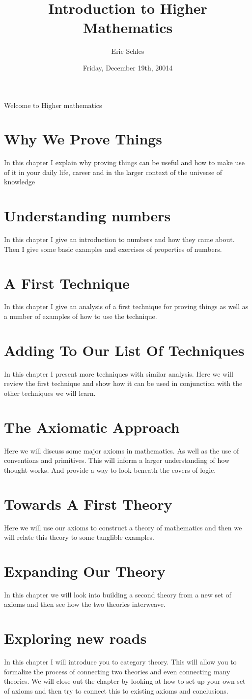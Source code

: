 \documentclass{book}
\title{Introduction to Higher Mathematics}
\author{Eric Schles}
\date{ Friday, December 19th, 20014}
\begin{document}
\maketitle
Welcome to Higher mathematics
\tableofcontents
\chapter{Why We Prove Things}
In this chapter I explain why proving things can be useful and how to make use of it in your daily life, career and in the larger context of the universe of knowledge
\chapter{Understanding numbers}
In this chapter I give an introduction to numbers and how they came about.  Then I give some basic examples and exercises of properties of numbers.  
\chapter{A First Technique}
In this chapter I give an analysis of a first technique for proving things as well as a number of examples of how to use the technique.
\chapter{Adding To Our List Of Techniques}
In this chapter I present more techniques with similar analysis.  Here we will review the first technique and show how it can be used in conjunction with the other techniques we will learn.
\chapter{The Axiomatic Approach}
Here we will discuss some major axioms in mathematics. As well as the use of conventions and primitives.  This will inform a larger understanding of how thought works. And provide a way to look beneath the covers of logic.
\chapter{Towards A First Theory}
Here we will use our axioms to construct a theory of mathematics and then we will relate this theory to some tanglible examples.
\chapter{Expanding Our Theory}
In this chapter we will look into building a second theory from a new set of axioms and then see how the two theories interweave.

\chapter{Exploring new roads}
In this chapter I will introduce you to category theory.  This will allow you to formalize the process of connecting two theories and even connecting many theories.  We will close out the chapter by looking at how to set up your own set of axioms and then try to connect this to existing axioms and conclusions.
\end{document}
